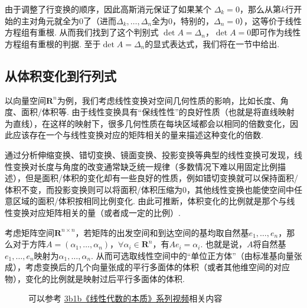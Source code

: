 由于调整了行变换的顺序，因此高斯消元保证了如果某个 $\Delta_k = 0$，那么从第$k$行开始的主对角元就全为$0$了（进而$\Delta_k,\ldots,\Delta_n$全为$0$，特别的，$\Delta_n=0$），这等价于线性方程组有重根. 从而我们找到了这个判别式 $\det A=\Delta_n$，$\det A=0$即可作为线性方程组有重根的判据. 至于$\det A=\Delta_n$的显式表达式，我们将在一节中给出.

\subsection{从体积变化到行列式}\label{subsec:从体积变化到行列式}

以向量空间$\mathbf{R}^n$为例，我们考虑线性变换对空间几何性质的影响，比如长度、角度、面积/体积等. 由于线性变换具有``保线性性''的良好性质（也就是将直线映射为直线），在这样的映射下，很多几何性质在每块区域都会以相同的倍数变化，因此应该存在一个与线性变换对应的矩阵相关的量来描述这种变化的倍数.

通过分析伸缩变换、错切变换、镜面变换、投影变换等典型的线性变换可发现，线性变换对长度与角度的改变通常缺乏统一规律（多数情况下难以用固定比例描述），但是面积/体积的变化却有一些良好的性质，例如错切变换就可以保持面积/体积不变，而投影变换则可以将面积/体积压缩为$0$，其他线性变换也能使空间中任意区域的面积/体积按相同比例变化. 由此可推断，体积变化的比例就是那个与线性变换对应矩阵相关的量（或者成一定的比例）.

考虑矩阵空间$\mathbf{R}^{n\times n}$，若矩阵的出发空间和到达空间的基均取自然基$e_1,\ldots,e_n$，那么对于方阵$A=(\alpha_1,\ldots,\alpha_n)$，$\forall\alpha_i\in\mathbf{R}^n$，有$Ae_i=\alpha_i$. 也就是说，$A$将自然基$e_1,\ldots,e_n$映射为$\alpha_1,\ldots,\alpha_n$. 从而可选取线性空间中的``单位正方体''（由标准基向量张成），考虑变换后的几个向量张成的平行多面体的体积（或者其他维空间的对应物），变化的比例就是映射过后平行多面体的体积.

\begin{figure}[htbp]
    \centering
    \caption{可以参考 \href{https://b23.tv/BV1ys411472E}{3b1b《线性代数的本质》系列视频}相关内容}
\end{figure}

